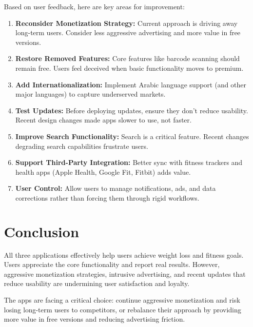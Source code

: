 \documentclass[12pt, a4paper]{article}
\begin{document}
Based on user feedback, here are key areas for improvement:

\begin{enumerate}
    \item \textbf{Reconsider Monetization Strategy:} Current approach is driving away long-term users. Consider less aggressive advertising and more value in free versions.
    
    \item \textbf{Restore Removed Features:} Core features like barcode scanning should remain free. Users feel deceived when basic functionality moves to premium.
    
    \item \textbf{Add Internationalization:} Implement Arabic language support (and other major languages) to capture underserved markets.
    
    \item \textbf{Test Updates:} Before deploying updates, ensure they don't reduce usability. Recent design changes made apps slower to use, not faster.
    
    \item \textbf{Improve Search Functionality:} Search is a critical feature. Recent changes degrading search capabilities frustrate users.
    
    \item \textbf{Support Third-Party Integration:} Better sync with fitness trackers and health apps (Apple Health, Google Fit, Fitbit) adds value.
    
    \item \textbf{User Control:} Allow users to manage notifications, ads, and data corrections rather than forcing them through rigid workflows.
\end{enumerate}

\section{Conclusion}

All three applications effectively help users achieve weight loss and fitness goals. Users appreciate the core functionality and report real results. However, aggressive monetization strategies, intrusive advertising, and recent updates that reduce usability are undermining user satisfaction and loyalty.

The apps are facing a critical choice: continue aggressive monetization and risk losing long-term users to competitors, or rebalance their approach by providing more value in free versions and reducing advertising friction.
\end{document}
